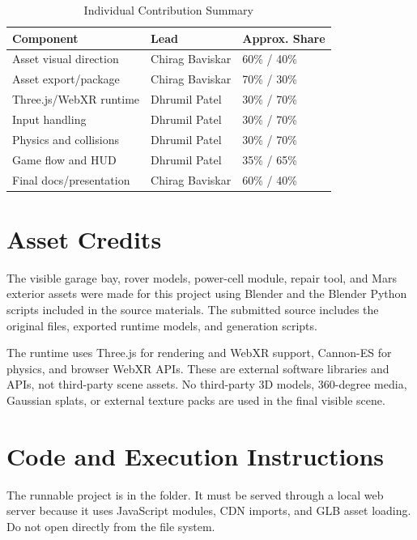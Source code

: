 \documentclass[conference]{IEEEtran}
\begin{document}
\begin{table}[t]
	\caption{Individual Contribution Summary}\label{tab:contributions}
	\centering
	\footnotesize
	\begin{tabular}{lll}
		\toprule
		\textbf{Component}      & \textbf{Lead}   & \textbf{Approx. Share} \\
		\midrule
		Asset visual direction  & Chirag Baviskar & 60\% / 40\%            \\
		Asset export/package    & Chirag Baviskar & 70\% / 30\%            \\
		Three.js/WebXR runtime  & Dhrumil Patel   & 30\% / 70\%            \\
		Input handling          & Dhrumil Patel   & 30\% / 70\%            \\
		Physics and collisions  & Dhrumil Patel   & 30\% / 70\%            \\
		Game flow and HUD       & Dhrumil Patel   & 35\% / 65\%            \\
		Final docs/presentation & Chirag Baviskar & 60\% / 40\%            \\
		\bottomrule
	\end{tabular}
\end{table}

\section{Asset Credits}

The visible garage bay, rover models, power-cell module, repair tool, and Mars
exterior assets were made for this project using Blender and the Blender Python
scripts included in the source materials. The submitted source includes the
original  files, exported  runtime models, and generation
scripts.

The runtime uses Three.js for rendering and WebXR support, Cannon-ES for
physics, and browser WebXR APIs. These are external software libraries and APIs,
not third-party scene assets. No third-party 3D models, 360-degree media,
Gaussian splats, or external texture packs are used in the final visible scene.

\section{Code and Execution Instructions}

The runnable project is in the  folder. It must be served through a
local web server because it uses JavaScript modules, CDN imports, and GLB asset
loading. Do not open  directly from the file system.
\end{document}
